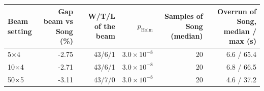 \begin{tabular}{lrrrrr}
\toprule
Beam setting & Gap beam vs Song (\%) & W/T/L of the beam & $p_{\mathrm{Holm}}$ & Samples of Song (median) & Overrun of Song, median / max (s) \\
\midrule
5$\times$4 & -2.75 & 43/6/1 & $3.0 \times 10^{-8}$ & 20 & 6.6 / 65.4 \\
10$\times$4 & -2.71 & 43/6/1 & $3.0 \times 10^{-8}$ & 20 & 6.8 / 66.5 \\
50$\times$5 & -3.11 & 43/7/0 & $3.0 \times 10^{-8}$ & 20 & 4.6 / 37.2 \\
\bottomrule
\end{tabular}
